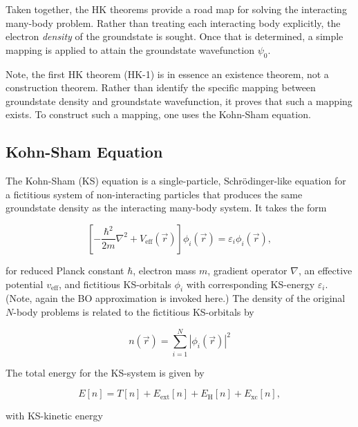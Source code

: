     Taken together, the HK theorems provide a road map for solving the interacting many-body problem. Rather than treating each interacting body explicitly, the electron \textit{density} of the groundstate is sought. Once that is determined, a simple mapping is applied to attain the groundstate wavefunction $\psi_0$.
    
    Note, the first HK theorem (HK-1) is in essence an existence theorem, not a construction theorem. Rather than identify the specific mapping between groundstate density and groundstate wavefunction, it proves that such a mapping exists. To construct such a mapping, one uses the Kohn-Sham equation.
    
    \subsection{Kohn-Sham Equation} 
    
    The Kohn-Sham (KS) equation is a single-particle, Schrödinger-like equation for a fictitious system of non-interacting particles that produces the same groundstate density as the interacting many-body system. It takes the form
    
    \begin{equation}
        \label{eq:ks}
        \left[-\frac{\hbar^2}{2 m}\nabla^2 + V_\text{eff}(\Vec{r}) \right]\phi_i(\Vec{r}) = \varepsilon_i \phi_i(\Vec{r}),
    \end{equation}
    
    \noindent for reduced Planck constant $\hbar$, electron mass $m$, gradient operator $\nabla$, an effective potential $v_\text{eff}$, and fictitious KS-orbitals $\phi_i$ with corresponding KS-energy $\varepsilon_i$. (Note, again the BO approximation is invoked here.) The density of the original $N$-body problems is related to the fictitious KS-orbitals by
    
    \begin{equation}
        n(\Vec{r}) = \sum\limits_{i=1}^N |\phi_i(\Vec{r}) |^2
    \end{equation}
    
    The total energy for the KS-system is given by
    
    \begin{equation}
    \label{eq:func1}
        E[n] = T[n] + E_\text{ext}[n] + E_\text{H}[n] + E_\text{xc}[n],
    \end{equation}
    
    \noindent with KS-kinetic energy
    
